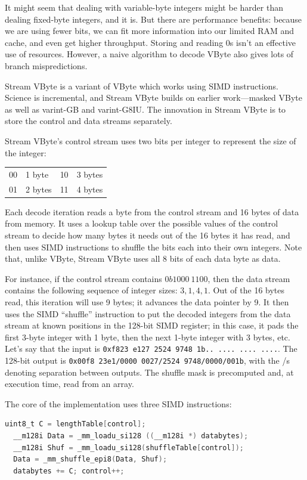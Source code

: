 \documentclass[a4paper]{report}
\begin{document}
It might seem that dealing with variable-byte integers might be
harder than dealing fixed-byte integers, and it is. But there are performance benefits: because we are
using fewer bits, we can fit more information into our limited RAM and
cache, and even get higher throughput. Storing and reading 0s isn't an effective
use of resources. However, a naive algorithm to decode VByte also gives
lots of branch mispredictions.

Stream VByte is a variant of VByte which works using SIMD instructions.
Science is incremental, and Stream VByte builds on earlier work---masked VByte
as well as {\sc varint}-GB and {\sc varint}-G8IU. The innovation in
Stream VByte is to store the control and data streams separately.

Stream VByte's control stream uses two bits per integer to represent the size of the integer:
\begin{center}
\vspace*{-1em}
\begin{tabular}{ll@{~~~~~~~~}ll}
00 & 1 byte & 10 & 3 bytes\\
01 & 2 bytes & 11 & 4 bytes
\end{tabular}
\end{center}

Each decode iteration reads a byte from the control stream and 16 bytes of data from memory.
It uses a lookup table over the possible values of the control stream to decide how many
bytes it needs out of the 16 bytes it has read, and then uses SIMD instructions to shuffle
the bits each into their own integers. Note that, unlike VByte, Stream VByte uses all 8 bits
of each data byte as data.

For instance, if the control stream contains $0b1000~1100$, then the data stream
contains the following sequence of integer sizes: $3, 1, 4, 1$. Out of the 16 bytes read,
this iteration will use 9 bytes; it advances the data pointer by 9. It then uses the SIMD
``shuffle'' instruction to put the decoded integers from the data stream at known positions in the
128-bit SIMD register; in this case, it pads the first 3-byte integer with 1 byte, then
the next 1-byte integer with 3 bytes, etc. Let's say that the input is
{\tt 0xf823~e127~2524~9748~1b..~....~....~....}. The 128-bit output is
{\tt 0x00f8~23e1/0000~0027/2524 9748/0000/001b}, with the /s denoting separation
between outputs. The shuffle mask is precomputed and, at
execution time, read from an array.

The core of the implementation uses three SIMD instructions:
\begin{lstlisting}[language=C]
  uint8_t C = lengthTable[control];
  __m128i Data = _mm_loadu_si128 ((__m128i *) databytes);
  __m128i Shuf = _mm_loadu_si128(shuffleTable[control]);
  Data = _mm_shuffle_epi8(Data, Shuf);
  databytes += C; control++;
\end{lstlisting}
\end{document}
